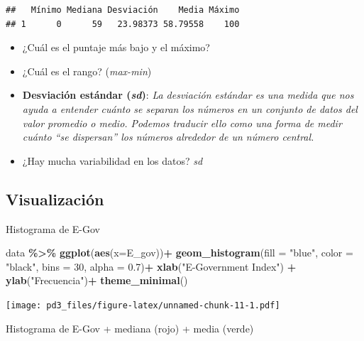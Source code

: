 \documentclass[
]{article}
\newenvironment{Shaded}{\begin{snugshade}}{\end{snugshade}}
\newcommand{\AttributeTok}[1]{\textcolor[rgb]{0.13,0.29,0.53}{#1}}
\newcommand{\DecValTok}[1]{\textcolor[rgb]{0.00,0.00,0.81}{#1}}
\newcommand{\FloatTok}[1]{\textcolor[rgb]{0.00,0.00,0.81}{#1}}
\newcommand{\FunctionTok}[1]{\textcolor[rgb]{0.13,0.29,0.53}{\textbf{#1}}}
\newcommand{\NormalTok}[1]{#1}
\newcommand{\SpecialCharTok}[1]{\textcolor[rgb]{0.81,0.36,0.00}{\textbf{#1}}}
\newcommand{\StringTok}[1]{\textcolor[rgb]{0.31,0.60,0.02}{#1}}
\begin{document}
\begin{verbatim}
##   Mínimo Mediana Desviación    Media Máximo
## 1      0      59   23.98373 58.79558    100
\end{verbatim}

\begin{itemize}
\item
  ¿Cuál es el puntaje más bajo y el máximo?
\item
  ¿Cuál es el rango? (\emph{max-min})
\item
  \textbf{Desviación estándar (\emph{sd})}: \emph{La desviación estándar
  es una medida que nos ayuda a entender cuánto se separan los números
  en un conjunto de datos del valor promedio o medio. Podemos traducir
  ello como una forma de medir cuánto ``se dispersan'' los números
  alrededor de un número central.}
\item
  ¿Hay mucha variabilidad en los datos? \emph{sd}
\end{itemize}

\hypertarget{visualizaciuxf3n}{%
\subsection{\texorpdfstring{\textbf{Visualización}}{Visualización}}\label{visualizaciuxf3n}}

Histograma de E-Gov

\begin{Shaded}
\begin{Highlighting}[]
\NormalTok{data }\SpecialCharTok{\%\textgreater{}\%}
  \FunctionTok{ggplot}\NormalTok{(}\FunctionTok{aes}\NormalTok{(}\AttributeTok{x=}\NormalTok{E\_gov))}\SpecialCharTok{+}
  \FunctionTok{geom\_histogram}\NormalTok{(}\AttributeTok{fill =} \StringTok{"blue"}\NormalTok{,}
    \AttributeTok{color =} \StringTok{"black"}\NormalTok{,}
    \AttributeTok{bins =} \DecValTok{30}\NormalTok{,}
    \AttributeTok{alpha =} \FloatTok{0.7}\NormalTok{)}\SpecialCharTok{+}
  \FunctionTok{xlab}\NormalTok{(}\StringTok{"E{-}Government Index"}\NormalTok{) }\SpecialCharTok{+}
  \FunctionTok{ylab}\NormalTok{(}\StringTok{"Frecuencia"}\NormalTok{)}\SpecialCharTok{+}
   \FunctionTok{theme\_minimal}\NormalTok{()}
\end{Highlighting}
\end{Shaded}

\texttt{[image: pd3\_files/figure-latex/unnamed-chunk-11-1.pdf]}

Histograma de E-Gov + mediana (rojo) + media (verde)
\end{document}
